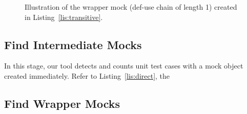\begin{figure}
	\centering
	
	\caption{Illustration of the wrapper mock (def-use chain of length 1) created in Listing~\ref{lis:transitive}.}
	\label{fig:wrapper}
\end{figure}

\subsection{Find Intermediate Mocks}
\label{subsec:intermediate}

In this stage, our tool detects and counts unit test cases with a mock object created immediately. Refer to Listing~\ref{lis:direct}, the 

\subsection{Find Wrapper Mocks}
\label{subsec:wrapper}
